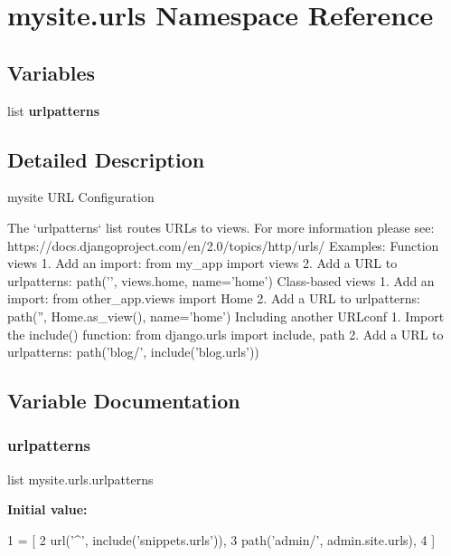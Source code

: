 \hypertarget{namespacemysite_1_1urls}{}\section{mysite.\+urls Namespace Reference}
\label{namespacemysite_1_1urls}
\subsection*{Variables}
\begin{DoxyCompactItemize}
\item 
list {\bfseries urlpatterns}
\end{DoxyCompactItemize}


\subsection{Detailed Description}
\begin{DoxyVerb}mysite URL Configuration

The `urlpatterns` list routes URLs to views. For more information please see:
https://docs.djangoproject.com/en/2.0/topics/http/urls/
Examples:
Function views
1. Add an import:  from my_app import views
2. Add a URL to urlpatterns:  path('', views.home, name='home')
Class-based views
1. Add an import:  from other_app.views import Home
2. Add a URL to urlpatterns:  path('', Home.as_view(), name='home')
Including another URLconf
1. Import the include() function: from django.urls import include, path
2. Add a URL to urlpatterns:  path('blog/', include('blog.urls'))
\end{DoxyVerb}
 

\subsection{Variable Documentation}
\mbox{\label{namespacemysite_1_1urls_a0ee3882cce96849684991a17cb2b04b6}} 
\subsubsection{\texorpdfstring{urlpatterns}{urlpatterns}}
{\footnotesize\ttfamily list mysite.\+urls.\+urlpatterns}

{\bfseries Initial value\+:}
\begin{DoxyCode}
1 =  [
2     url(\textcolor{stringliteral}{'^'}, include(\textcolor{stringliteral}{'snippets.urls'})),
3     path(\textcolor{stringliteral}{'admin/'}, admin.site.urls),
4 ]
\end{DoxyCode}
